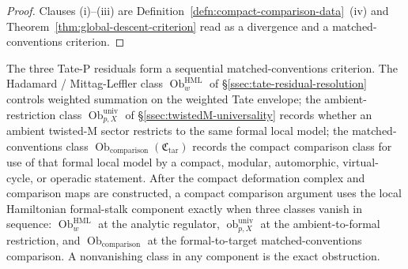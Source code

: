 \begin{proof}
  Clauses (i)--(iii) are
  Definition~\ref{defn:compact-comparison-data}~(iv) and
  Theorem~\ref{thm:global-descent-criterion} read as a divergence and
  a matched-conventions criterion.
\end{proof}

The three Tate-P residuals form a sequential matched-conventions criterion.
The Hadamard / Mittag-Leffler class
\(\operatorname{Ob}^{\mathrm{HML}}_{w}\) of
\S\ref{ssec:tate-residual-resolution} controls weighted summation on
the weighted Tate envelope; the ambient-restriction class
\(\operatorname{Ob}^{\mathrm{univ}}_{p,X}\) of
\S\ref{ssec:twistedM-universality} records whether an ambient
twisted-M sector restricts to the same formal local model; the
matched-conventions class
\(\operatorname{Ob}_{\mathrm{comparison}}(\mathfrak C_{\mathrm{tar}})\)
records the compact comparison class for use of that formal local
model by a compact, modular, automorphic, virtual-cycle, or operadic
statement.  After the compact deformation complex and comparison maps are
constructed, a compact comparison argument uses the local Hamiltonian formal-stalk
component exactly when three classes vanish in sequence:
\(\operatorname{Ob}^{\mathrm{HML}}_{w}\) at the analytic regulator,
\(\operatorname{ob}^{\mathrm{univ}}_{p,X}\) at the ambient-to-formal
restriction, and \(\operatorname{Ob}_{\mathrm{comparison}}\) at the
formal-to-target matched-conventions comparison.  A nonvanishing class in
any component is the exact obstruction.
